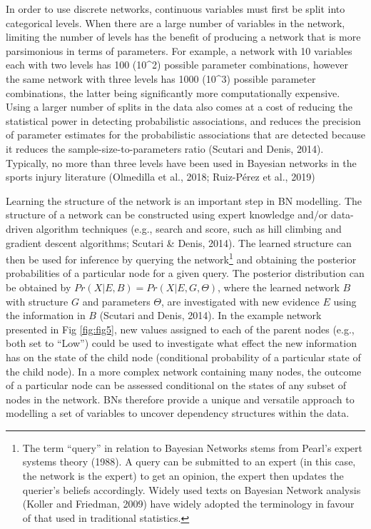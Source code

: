 \documentclass[
  english,
  man]{apa6}
\begin{document}
In order to use discrete networks, continuous variables must first be split into categorical levels.
When there are a large number of variables in the network, limiting the number of levels has the benefit of producing a network that is more parsimonious in terms of parameters. For example, a network with 10 variables each with two levels has 100 (10\^{}2) possible parameter combinations, however the same network with three levels has 1000 (10\^{}3) possible parameter combinations, the latter being significantly more computationally expensive. Using a larger number of splits in the data also comes at a cost of reducing the statistical power in detecting probabilistic associations, and reduces the precision of parameter estimates for the probabilistic associations that are detected because it reduces the sample-size-to-parameters ratio (Scutari and Denis, 2014). Typically, no more than three levels have been used in Bayesian networks in the sports injury literature (Olmedilla et al., 2018; Ruiz-Pérez et al., 2019)

Learning the structure of the network is an important step in BN modelling. The structure of a network can be constructed using expert knowledge and/or data-driven algorithm techniques (e.g., search and score, such as hill climbing and gradient descent algorithms; Scutari \& Denis, 2014).
The learned structure can then be used for inference by querying the network\footnote{The term ``query'' in relation to Bayesian Networks stems from Pearl's expert systems theory (1988). A query can be submitted to an expert (in this case, the network is the expert) to get an opinion, the expert then updates the querier's beliefs accordingly. Widely used texts on Bayesian Network analysis (Koller and Friedman, 2009) have widely adopted the terminology in favour of that used in traditional statistics.} and obtaining the posterior probabilities of a particular node for a given query.
The posterior distribution can be obtained by \(Pr(X|E,B) = Pr(X|E,G,\Theta)\), where the learned network \(B\) with structure \(G\) and parameters \(\Theta\), are investigated with new evidence \(E\) using the information in \(B\) (Scutari and Denis, 2014).
In the example network presented in Fig \ref{fig:fig5}, new values assigned to each of the parent nodes (e.g., both set to ``Low'') could be used to investigate what effect the new information has on the state of the child node (conditional probability of a particular state of the child node).
In a more complex network containing many nodes, the outcome of a particular node can be assessed conditional on the states of any subset of nodes in the network.
BNs therefore provide a unique and versatile approach to modelling a set of variables to uncover dependency structures within the data.
\end{document}
